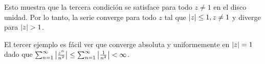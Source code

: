 Esto muestra que la tercera condición se satisface para todo $z \not = 1$ en el disco unidad. Por lo tanto, la serie converge para todo $z$ tal que $\left\lvert z\right\rvert \leq 1, z \not = 1$ y diverge para $\left\lvert z\right\rvert > 1$. \\ \par



El tercer ejemplo es fácil ver que converge absoluta y uniformemente en $\left\lvert z\right\rvert = 1$ dado que $\sum_{n=1}^{\infty} \left\lvert\frac{z^n}{n^2}\right\rvert \leq \sum_{n=1}^{\infty} \left\lvert\frac{1}{n^2}\right\rvert < \infty$.



